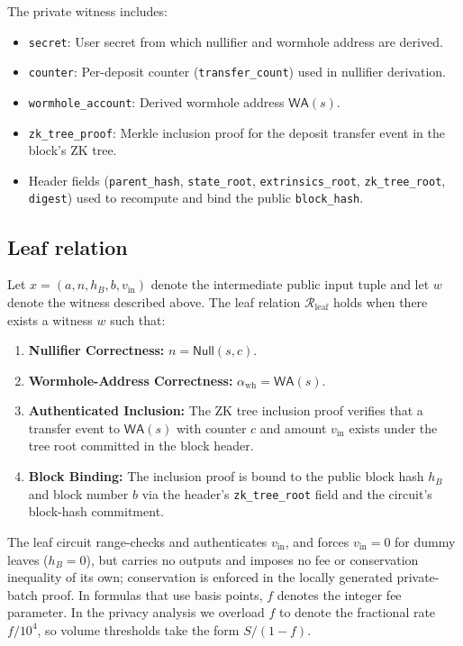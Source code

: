\documentclass{iacrcc}
\newcommand{\WA}{\mathsf{WA}}
\newcommand{\Null}{\mathsf{Null}}
\begin{document}
The private witness includes:
\begin{itemize}[leftmargin=1.5em]
    \item \texttt{secret}: User secret from which nullifier and wormhole address are derived.
    \item \texttt{counter}: Per-deposit counter (\texttt{transfer\_count}) used in nullifier derivation.
    \item \texttt{wormhole\_account}: Derived wormhole address \(\WA(s)\).
    \item \texttt{zk\_tree\_proof}: Merkle inclusion proof for the deposit transfer event in the block's ZK tree.
    \item Header fields (\texttt{parent\_hash}, \texttt{state\_root}, \texttt{extrinsics\_root}, \texttt{zk\_tree\_root}, \texttt{digest}) used to recompute and bind the public \texttt{block\_hash}.
\end{itemize}

\subsection{Leaf relation}

Let \(x = (a, n, h_B, b, v_{\mathrm{in}})\) denote the intermediate public input tuple and let \(w\) denote the witness described above. The leaf relation \(\mathcal{R}_{\mathrm{leaf}}\) holds when there exists a witness \(w\) such that:
\begin{enumerate}[label=(C\arabic*),leftmargin=1.9em]
    \item \textbf{Nullifier Correctness:} \(n = \Null(s,c)\).
    \item \textbf{Wormhole-Address Correctness:} \(\alpha_{\mathrm{wh}} = \WA(s)\).
    \item \textbf{Authenticated Inclusion:} The ZK tree inclusion proof verifies that a transfer event to \(\WA(s)\) with counter \(c\) and amount \(v_{\mathrm{in}}\) exists under the tree root committed in the block header.
    \item \textbf{Block Binding:} The inclusion proof is bound to the public block hash \(h_B\) and block number \(b\) via the header's \texttt{zk\_tree\_root} field and the circuit's block-hash commitment.
\end{enumerate}

The leaf circuit range-checks and authenticates \(v_{\mathrm{in}}\), and forces \(v_{\mathrm{in}} = 0\) for dummy leaves (\(h_B = 0\)), but carries no outputs and imposes no fee or conservation inequality of its own; conservation is enforced in the locally generated private-batch proof. In formulas that use basis points, \(f\) denotes the integer fee parameter. In the privacy analysis we overload \(f\) to denote the fractional rate \(f/10^4\), so volume thresholds take the form \(S/(1-f)\).
\end{document}
